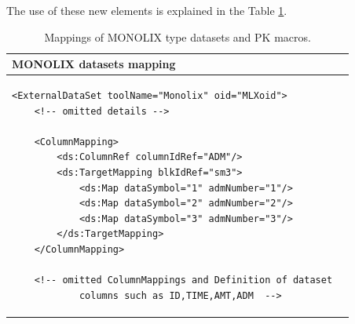 The use of these new elements is explained in the Table \ref{tab:mappingNONMEMAndMacros}. 
\begin{table}[ht!]
\setlength{\tabcolsep}{5pt}
\begin{center}
\begin{tabular}{l}
  \hline
  \hline
MONOLIX datasets mapping \\ %
  \hline
\lstset{language=XML}
\begin{lstlisting}
<ExternalDataSet toolName="Monolix" oid="MLXoid">
    <!-- omitted details -->
    
    <ColumnMapping>
        <ds:ColumnRef columnIdRef="ADM"/>
        <ds:TargetMapping blkIdRef="sm3">
            <ds:Map dataSymbol="1" admNumber="1"/>
            <ds:Map dataSymbol="2" admNumber="2"/>
            <ds:Map dataSymbol="3" admNumber="3"/>
        </ds:TargetMapping>
    </ColumnMapping>
    
    <!-- omitted ColumnMappings and Definition of dataset  
    		columns such as ID,TIME,AMT,ADM  -->
\end{lstlisting}
%    
%    
%    
%    
\\
    \hline
\end{tabular}
\caption{Mappings of MONOLIX type datasets and PK macros.}
\label{tab:mappingNONMEMAndMacros}
\end{center}
\end{table}



